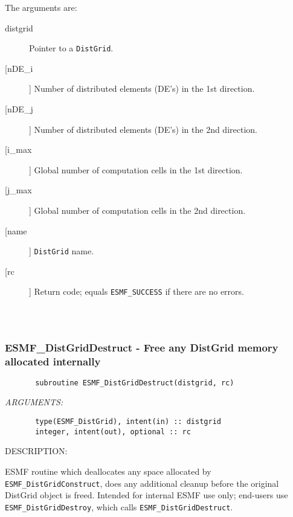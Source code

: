        The arguments are:
       \begin{description}
       \item[distgrid] 
            Pointer to a {\tt DistGrid}.
       \item[[nDE\_i]] 
            Number of distributed elements (DE's) in the 1st direction.
       \item[[nDE\_j]] 
            Number of distributed elements (DE's) in the 2nd direction.
       \item[[i\_max]] 
            Global number of computation cells in the 1st direction.
       \item[[j\_max]] 
            Global number of computation cells in the 2nd direction.
       \item[[name]] 
            {\tt DistGrid} name.
       \item[[rc]] 
            Return code; equals {\tt ESMF\_SUCCESS} if there are no errors.
       \end{description}
  
\begin{verbatim} \end{verbatim}
 
 
\mbox{}\hrulefill\ 
 
\subsubsection{ESMF\_DistGridDestruct - Free any DistGrid memory allocated internally}


\begin{verbatim}       subroutine ESMF_DistGridDestruct(distgrid, rc)\end{verbatim}{\em ARGUMENTS:}
\begin{verbatim}       type(ESMF_DistGrid), intent(in) :: distgrid    
       integer, intent(out), optional :: rc         \end{verbatim}
{\sf DESCRIPTION:\\ }


       ESMF routine which deallocates any space allocated by
      {\tt  ESMF\_DistGridConstruct}, does any additional cleanup before the
       original DistGrid object is freed.  Intended for internal ESMF
       use only; end-users use {\tt ESMF\_DistGridDestroy}, which calls
       {\tt ESMF_DistGridDestruct}.  
  
